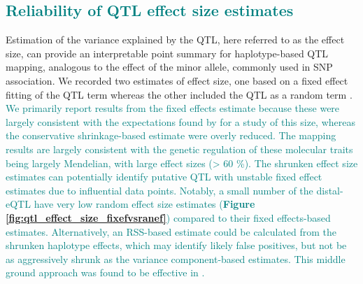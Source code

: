 \documentclass[9pt,twocolumn,twoside]{gsajnl}
\newcommand{\WV}[2]{\textcolor{red}{#1\footnote{\textcolor{red}{WV: #2}}}}
\newcommand{\GKinline}[1]{\textcolor{teal}{#1}}
\begin{document}
\subsection{\GKinline{Reliability of QTL effect size estimates}}


Estimation of the variance explained by the QTL, here referred to as the effect size, can provide an interpretable point summary for haplotype-based QTL mapping, analogous to the effect of the minor allele, commonly used in SNP association. We recorded two estimates of effect size, one based on a fixed effect fitting of the QTL term whereas the other included the QTL as a random term \citep{Wei2016}. 
\GKinline{We primarily report results from the fixed effects estimate because these were largely consistent with the expectations found by \cite{Keele2019} for a study of this size, whereas the conservative shrinkage-based estimate were overly reduced. The mapping results are largely consistent with the genetic regulation of these molecular traits being largely Mendelian, with large effect sizes (> 60 \%).}
\GKinline{The shrunken effect size estimates can potentially identify putative QTL with unstable fixed effect estimates due to influential data points. Notably, a small number of the distal-eQTL have very low random effect size estimates (\textbf{Figure \ref{fig:qtl_effect_size_fixefvsranef}}) compared to their fixed effects-based estimates. Alternatively, an RSS-based estimate could be calculated from the shrunken haplotype effects, which may identify likely false positives, but not be as aggressively shrunk as the variance component-based estimates. This middle ground approach was found to be effective in \cite{Keele2018}.}
\end{document}
